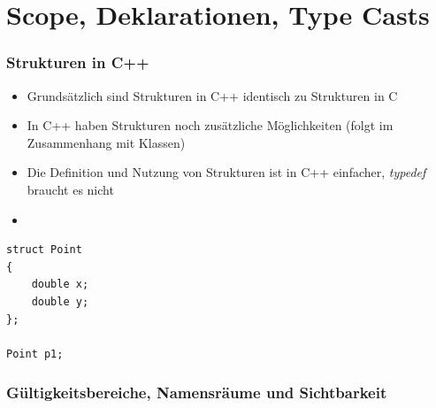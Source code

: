
\part{Scope, Deklarationen, Type Casts}

\section{Strukturen in C++}
\label{sec:strukturen}
\vspace{-\baselineskip}
\begin{minipage}{0.75\linewidth}
\begin{itemize}
	\item Grundsätzlich sind Strukturen in C++ identisch zu Strukturen in C
	\item In C++ haben Strukturen noch zusätzliche Möglichkeiten (folgt im Zusammenhang mit Klassen)
	\item Die Definition und Nutzung von Strukturen ist in C++ einfacher, \emph{typedef} braucht es nicht
	\item[\-]
\end{itemize}
\end{minipage}%
\hspace{0.05\linewidth}
\begin{minipage}{0.15\linewidth}
\vspace{-\baselineskip}
\begin{lstlisting}
struct Point
{
	double x;
	double y;
};
	
Point p1;
\end{lstlisting}
\vfill\null
\end{minipage}

\vspace{-\baselineskip}
\section{Gültigkeitsbereiche, Namensräume und Sichtbarkeit}


